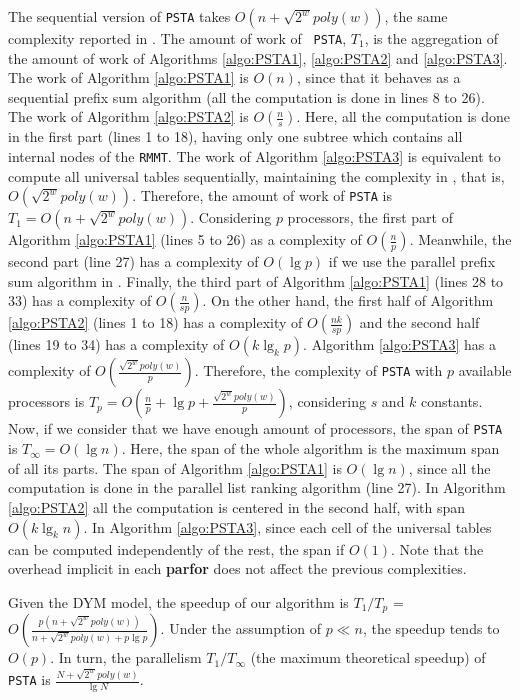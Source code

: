 The sequential version of {\tt PSTA} takes $O(n+\sqrt{2^{w}}poly(w))$,
the same complexity reported in
\cite{Navarro:2014:FFS:2620785.2601073}. The amount of work of {\tt
PSTA}, $T_1$, is the aggregation of the amount of work of Algorithms
\ref{algo:PSTA1}, \ref{algo:PSTA2} and \ref{algo:PSTA3}. The work of
Algorithm \ref{algo:PSTA1} is $O(n)$, since that it behaves as a
sequential prefix sum algorithm (all the computation is done in
lines 8 to 26). The work of Algorithm \ref{algo:PSTA2} is
$O(\frac{n}{s})$. Here, all the computation is done in the first part
(lines 1 to 18), having only one subtree which contains all internal
nodes of the {\tt RMMT}. The work of Algorithm \ref{algo:PSTA3} is
equivalent to compute all universal tables sequentially, maintaining
the complexity in \cite{Navarro:2014:FFS:2620785.2601073}, that is,
$O(\sqrt{2^{w}}poly(w))$. Therefore, the amount of work of {\tt PSTA}
is $T_{1}=O(n+\sqrt{2^{w}}poly(w))$. Considering $p$ processors, the
first part of Algorithm \ref{algo:PSTA1} (lines 5 to 26) as a
complexity of $O(\frac{n}{p})$. Meanwhile, the second part (line 27)
has a complexity of $O(\lg p)$ if we use the parallel prefix sum
algorithm in \cite{Reif1993}. Finally, the third part of Algorithm
\ref{algo:PSTA1} (lines 28 to 33) has a complexity of
$O(\frac{n}{sp})$. On the other hand, the first half of Algorithm
\ref{algo:PSTA2} (lines 1 to 18) has a complexity of
$O(\frac{nk}{sp})$ and the second half (lines 19 to 34) has a
complexity of $O(k\lg_{k}p)$. Algorithm \ref{algo:PSTA3} has a
complexity of $O(\frac{\sqrt{2^{w}}poly(w)}{p})$. Therefore, the
complexity of {\tt PSTA} with $p$ available processors is $T_p =
O(\frac{n}{p}+\lg p+\frac{\sqrt{2^{w}}poly(w)}{p})$, considering $s$
and $k$ constants. Now, if we consider that we have enough amount of
processors, the span of {\tt PSTA} is $T_{\infty}=O(\lg n)$. Here, the
span of the whole algorithm is the maximum span of all its parts. The
span of Algorithm \ref{algo:PSTA1} is $O(\lg n)$, since all the
computation is done in the parallel list ranking algorithm (line
27). In Algorithm \ref{algo:PSTA2} all the computation is centered in
the second half, with span $O(k\lg_{k}n)$. In Algorithm
\ref{algo:PSTA3}, since each cell of the universal tables can be
computed independently of the rest, the span if $O(1)$. Note that the
overhead implicit in each {\bf parfor} does not affect the previous
complexities.

Given the DYM model, the speedup of our algorithm is $T_1/T_p$ =
$O(\frac{p(n+\sqrt{2^{w}}poly(w))}{n+\sqrt{2^{w}}poly(w)+p\lg
p})$. Under the assumption of $p\ll n$, the speedup tends to
$O(p)$. In turn, the
parallelism $T_1/T_{\infty}$ (the maximum theoretical speedup) of {\tt
PSTA} is $\frac{N+\sqrt{2^{w}}poly(w)}{\lg N}$.

